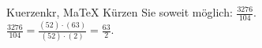 \begin{MAufgabe}{Kuerzen}{kr, MaTeX}
K\"urzen Sie soweit m\"oglich: $\frac{3276}{104}$.\\ 
\ifLsg\MLoesung
\quad $\frac{3276}{104}=\frac{(52)\cdot(63)}{(52)\cdot(2)}=\frac{63}{2}$.\else\relax\fi
 \end{MAufgabe}